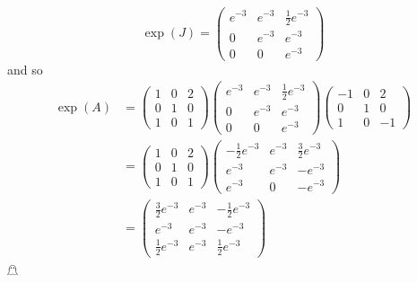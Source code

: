 \documentclass{article}
\begin{document}
\begin{itemize}
    \[\exp(J) = \begin{pmatrix}
        e^{-3} & e^{-3} & \frac{1}{2}e^{-3}\\
        0 & e^{-3} & e^{-3}\\
        0 & 0 & e^{-3}
    \end{pmatrix}\]
    and so
    \begin{align*}
        \exp(A) &= \begin{pmatrix}
            1 & 0 & 2\\
            0 & 1 & 0\\
            1 & 0 & 1
        \end{pmatrix}
        \begin{pmatrix}
            e^{-3} & e^{-3} & \frac{1}{2}e^{-3}\\
            0 & e^{-3} & e^{-3}\\
            0 & 0 & e^{-3}
        \end{pmatrix}\begin{pmatrix}
            -1 & 0 & 2\\
            0 & 1 & 0\\
            1 & 0 & -1
        \end{pmatrix}\\
        &= \begin{pmatrix}
            1 & 0 & 2\\
            0 & 1 & 0\\
            1 & 0 & 1
        \end{pmatrix}\begin{pmatrix}
            -\frac{1}{2}e^{-3} & e^{-3} & \frac{3}{2}e^{-3}\\
            e^{-3} & e^{-3} & -e^{-3}\\
            e^{-3} & 0 & -e^{-3}
        \end{pmatrix}\\
        &= \begin{pmatrix}
            \frac{3}{2}e^{-3} & e^{-3} & -\frac{1}{2}e^{-3}\\
            e^{-3} & e^{-3} & -e^{-3}\\
            \frac{1}{2}e^{-3} & e^{-3} & \frac{1}{2}e^{-3}
        \end{pmatrix}
    \end{align*}
    \hfill $\mathghost$
\end{itemize}
\end{document}
